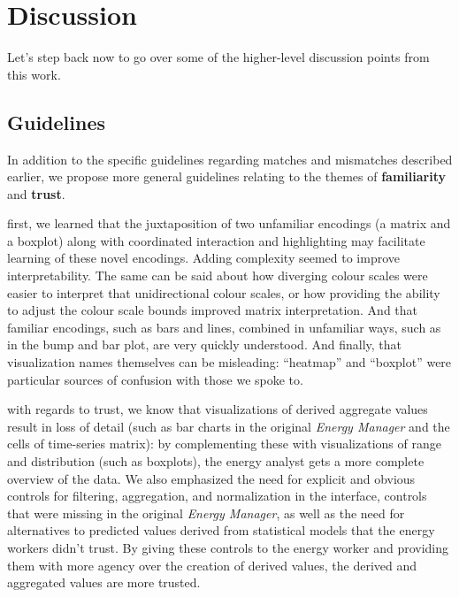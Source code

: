 \documentclass[journal]{vgtc}                %
\newcommand{\bstart}[1]{\vspace{1mm} \noindent{\textbf{#1:}}}
\begin{document}

\section{Discussion}
\label{discussion}


Let's step back now to go over some of the higher-level discussion points from this work.


\subsection{Guidelines}
\label{discussion-guidelines}


In addition to the specific guidelines regarding matches and mismatches described earlier, we propose more general guidelines relating to the themes of {\bf familiarity} and {\bf trust}.

\bstart{Familiarity} first, we learned that the juxtaposition of two unfamiliar encodings (a matrix and a boxplot) along with coordinated interaction and highlighting may facilitate learning of these novel encodings. 
Adding complexity seemed to improve interpretability. 
The same can be said about how diverging colour scales were easier to interpret that unidirectional colour scales, or how providing the ability to adjust the colour scale bounds improved matrix interpretation.
And that familiar encodings, such as bars and lines, combined in unfamiliar ways, such as in the bump and bar plot, are very quickly understood.
And finally, that visualization names themselves can be misleading: ``heatmap'' and ``boxplot'' were particular sources of confusion with those we spoke to.

\bstart{Trust} with regards to trust, we know that visualizations of derived aggregate values result in loss of detail (such as bar charts in the original {\it Energy Manager} and the cells of time-series matrix): by complementing these with visualizations of range and distribution (such as boxplots), the energy analyst gets a more complete overview of the data.
We also emphasized the need for explicit and obvious controls for filtering, aggregation, and normalization in the interface, controls that were missing in the original {\it Energy Manager}, as well as the need for alternatives to predicted values derived from statistical models that the energy workers didn't trust. 
By giving these controls to the energy worker and providing them with more agency over the creation of derived values, the derived and aggregated values are more trusted. 
\end{document}
